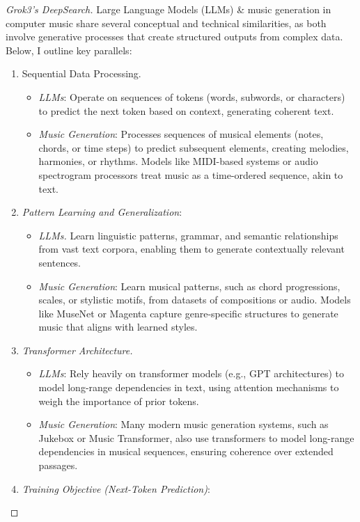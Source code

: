 \documentclass{article}
\begin{document}
\begin{proof}[Grok3's DeepSearch]
	Large Language Models (LLMs) \& music generation in computer music share several conceptual and technical similarities, as both involve generative processes that create structured outputs from complex data. Below, I outline key parallels:
	\begin{enumerate}
		\item {\sf Sequential Data Processing.}
		\begin{itemize}
			\item {\it LLMs}: Operate on sequences of tokens (words, subwords, or characters) to predict the next token based on context, generating coherent text.
			\item {\it Music Generation}: Processes sequences of musical elements (notes, chords, or time steps) to predict subsequent elements, creating melodies, harmonies, or rhythms. Models like MIDI-based systems or audio spectrogram processors treat music as a time-ordered sequence, akin to text.
		\end{itemize}
		\item {\it Pattern Learning and Generalization}:
		\begin{itemize}
			\item {\it LLMs.} Learn linguistic patterns, grammar, and semantic relationships from vast text corpora, enabling them to generate contextually relevant sentences.
			\item {\it Music Generation}: Learn musical patterns, such as chord progressions, scales, or stylistic motifs, from datasets of compositions or audio. Models like MuseNet or Magenta capture genre-specific structures to generate music that aligns with learned styles.
		\end{itemize}
		\item {\it Transformer Architecture.}
		\begin{itemize}
			\item {\it LLMs}: Rely heavily on transformer models (e.g., GPT architectures) to model long-range dependencies in text, using attention mechanisms to weigh the importance of prior tokens.
			\item {\it Music Generation}: Many modern music generation systems, such as Jukebox or Music Transformer, also use transformers to model long-range dependencies in musical sequences, ensuring coherence over extended passages.
		\end{itemize}
		\item {\it Training Objective (Next-Token Prediction)}:

\end{enumerate}
\end{proof}
\end{document}
